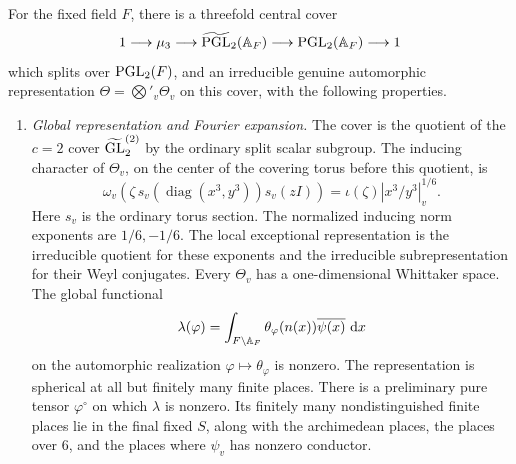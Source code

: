 \begin{proposition}\label{prop:theta-input}
For the fixed field \(F\), there is a threefold central cover
\[
 1\longrightarrow\mu_3
 \longrightarrow\widetilde{\mathrm{PGL}}_2(\mathbb{A}_F)
 \longrightarrow\mathrm{PGL}_2(\mathbb{A}_F)\longrightarrow1
\]
which splits over \(\mathrm{PGL}_2(F)\), and an irreducible genuine automorphic
representation
\(\Theta=\bigotimes'_v\Theta_v\) on this cover, with the following
properties.

\begin{enumerate}[label=\textup{(\roman*)}]
\item \emph{Global representation and Fourier expansion.}
  The cover is the quotient of the \(c=2\) cover
  \(\widetilde{\mathrm{GL}}_2^{(2)}\) by the ordinary split scalar subgroup.
  The inducing character of \(\Theta_v\), on the center of the covering
  torus before this quotient, is
  \begin{equation}\label{eq:theta-central-datum}
  \omega_v\!\left(\zeta\,s_v(\operatorname{diag}(x^3,y^3))s_v(zI)\right)
   =\iota(\zeta)\left|x^3/y^3\right|_v^{1/6}.
  \end{equation}
  Here \(s_v\) is the ordinary torus section.  The normalized inducing
  norm exponents are \(1/6,-1/6\).  The local exceptional representation is the irreducible
  quotient for these exponents and the irreducible subrepresentation for
  their Weyl conjugates.
  Every \(\Theta_v\) has a one-dimensional Whittaker space.
  The global functional
  \[
   \lambda(\varphi)=
    \int_{F\backslash\mathbb{A}_F}\theta_\varphi(n(x))
          \overline{\psi(x)}\,\,\mathrm{d} x
  \]
  on the automorphic realization \(\varphi\mapsto\theta_\varphi\) is
  nonzero.  The representation is spherical at all but finitely many
  finite places.
  There is a preliminary pure tensor \(\varphi^\circ\) on which
  \(\lambda\) is nonzero.  Its finitely many nondistinguished finite
  places lie in the final fixed \(S\), along with the archimedean places,
  the places over \(6\), and the places where \(\psi_v\) has nonzero conductor.


\end{enumerate}
\end{proposition}
